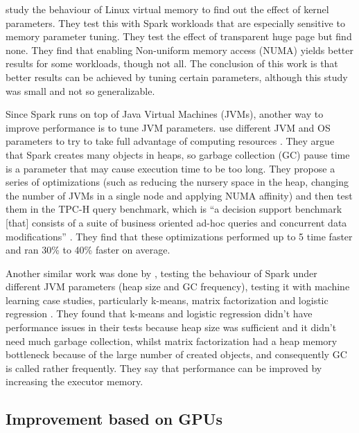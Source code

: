 \documentclass{article}
\begin{document}
\citeauthor{Wang2016} \cite{Wang2016} study the behaviour of Linux virtual memory to find out the effect of kernel parameters. They test this with Spark workloads that are especially sensitive to memory parameter tuning. They test the effect of transparent huge page but find none. They find that enabling Non-uniform memory access (NUMA) yields better results for some workloads, though not all. The conclusion of this work is that better results can be achieved by tuning certain parameters, although this study was small and not so generalizable.

Since Spark runs on top of Java Virtual Machines (JVMs), another way to improve performance is to tune JVM parameters. \citeauthor{Chiba2016} use different JVM and OS parameters to try to take full advantage of computing resources \cite{Chiba2016}. They argue that Spark creates many objects in heaps, so garbage collection (GC) pause time is a parameter that may cause execution time to be too long. They propose a series of optimizations (such as reducing the nursery space in the heap, changing the number of JVMs in a single node and applying NUMA affinity) and then test them in the TPC-H query benchmark,  which is ``a decision support benchmark [that] consists of a suite of business oriented ad-hoc queries and concurrent data modifications'' \cite{TPC_H_benchmark}. They find that these optimizations performed up to 5 time faster and ran 30\% to 40\% faster on average.

Another similar work was done by \citeauthor{Hema2016}, testing the behaviour of Spark under different JVM parameters (heap size and GC frequency), testing it with machine learning case studies, particularly k-means, matrix factorization and logistic regression \cite{Hema2016}. They found that k-means and logistic regression didn't have performance issues in their tests because heap size was sufficient and it didn't need much garbage collection, whilst matrix factorization had a heap memory bottleneck because of the large number of created objects, and consequently GC is called rather frequently. They say that performance can be improved by increasing the executor memory.

\subsection{Improvement based on GPUs}
\end{document}
